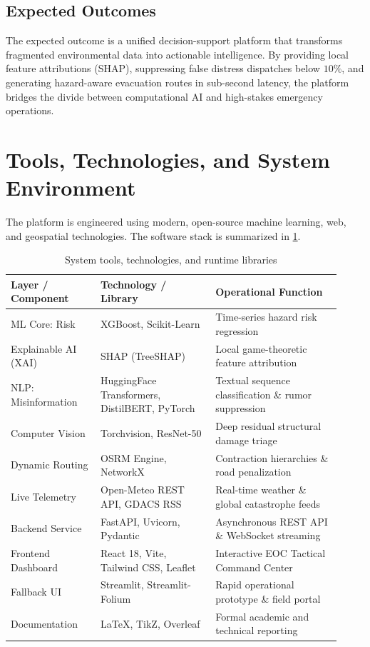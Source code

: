 \documentclass{article}
\begin{document}
\subsection{Expected Outcomes}
The expected outcome is a unified decision-support platform that transforms fragmented environmental data into actionable intelligence. By providing local feature attributions (SHAP), suppressing false distress dispatches below $10\%$, and generating hazard-aware evacuation routes in sub-second latency, the platform bridges the divide between computational AI and high-stakes emergency operations.

\section{Tools, Technologies, and System Environment}
The platform is engineered using modern, open-source machine learning, web, and geospatial technologies. The software stack is summarized in \cref{tab:tech_stack}.

\begin{table}[H]
\centering
\caption{System tools, technologies, and runtime libraries}
\label{tab:tech_stack}
\begin{tabular}{p{0.25\linewidth} p{0.32\linewidth} p{0.35\linewidth}}
\toprule
\textbf{Layer / Component} & \textbf{Technology / Library} & \textbf{Operational Function}\\
\midrule
ML Core: Risk & XGBoost, Scikit-Learn & Time-series hazard risk regression\\
Explainable AI (XAI) & SHAP (TreeSHAP) & Local game-theoretic feature attribution\\
NLP: Misinformation & HuggingFace Transformers, \newline DistilBERT, PyTorch & Textual sequence classification \& rumor suppression\\
Computer Vision & Torchvision, ResNet-50 & Deep residual structural damage triage\\
Dynamic Routing & OSRM Engine, NetworkX & Contraction hierarchies \& road penalization\\
Live Telemetry & Open-Meteo REST API, GDACS RSS & Real-time weather \& global catastrophe feeds\\
Backend Service & FastAPI, Uvicorn, Pydantic & Asynchronous REST API \& WebSocket streaming\\
Frontend Dashboard & React 18, Vite, Tailwind CSS, Leaflet & Interactive EOC Tactical Command Center\\
Fallback UI & Streamlit, Streamlit-Folium & Rapid operational prototype \& field portal\\
Documentation & LaTeX, TikZ, Overleaf & Formal academic and technical reporting\\
\bottomrule
\end{tabular}
\end{table}
\end{document}
